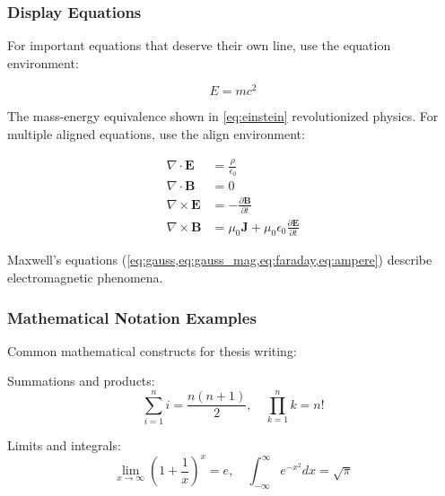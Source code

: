 \subsubsection{Display Equations}

For important equations that deserve their own line, use the equation environment:

\begin{equation}
    E = mc^2
    \label{eq:einstein}
\end{equation}

The mass-energy equivalence shown in \cref{eq:einstein} revolutionized physics. For multiple aligned equations, use the align environment:

\begin{align}
    \nabla \cdot \mathbf{E}  & = \frac{\rho}{\epsilon_0} \label{eq:gauss}                                                  \\
    \nabla \cdot \mathbf{B}  & = 0 \label{eq:gauss_mag}                                                                    \\
    \nabla \times \mathbf{E} & = -\frac{\partial \mathbf{B}}{\partial t} \label{eq:faraday}                                \\
    \nabla \times \mathbf{B} & = \mu_0\mathbf{J} + \mu_0\epsilon_0\frac{\partial \mathbf{E}}{\partial t} \label{eq:ampere}
\end{align}

Maxwell's equations (\cref{eq:gauss,eq:gauss_mag,eq:faraday,eq:ampere}) describe electromagnetic phenomena.

\subsubsection{Mathematical Notation Examples}

Common mathematical constructs for thesis writing:

Summations and products:
\begin{equation}
    \sum_{i=1}^{n} i = \frac{n(n+1)}{2}, \quad \prod_{k=1}^{n} k = n!
\end{equation}

Limits and integrals:
\begin{equation}
    \lim_{x \to \infty} \left(1 + \frac{1}{x}\right)^x = e, \quad \int_{-\infty}^{\infty} e^{-x^2} dx = \sqrt{\pi}
\end{equation}

